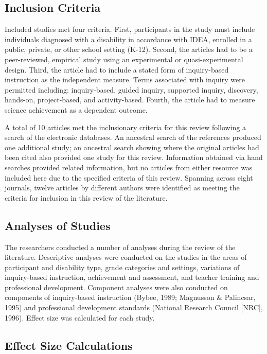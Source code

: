 \documentclass[11.5pt]{sig-alternate} %
\begin{document}
\begin{large}
\subsection*{Inclusion Criteria}

Included studies met four criteria.  First, participants in the study must include individuals diagnosed with a disability in accordance with IDEA, enrolled in a public, private, or other school setting (K-12).  Second, the articles had to be a peer-reviewed, empirical study using an experimental or quasi-experimental design.  Third, the article had to include a stated form of inquiry-based instruction as the independent measure.  Terms associated with inquiry were permitted including: inquiry-based, guided inquiry, supported inquiry, discovery, hands-on, project-based, and activity-based.  Fourth, the article had to measure science achievement as a dependent outcome. 

A total of 10 articles met the inclusionary criteria for this review following a search of the electronic databases.  An ancestral search of the references produced one additional study; an ancestral search showing where the original articles had been cited also provided one study for this review.  Information obtained via hand searches provided related information, but no articles from either resource was included here due to the specified criteria of this review.  Spanning across eight journals, twelve articles by different authors were identified as meeting the criteria for inclusion in this review of the literature.  

\subsection*{Analyses of Studies}

The researchers conducted a number of analyses during the review of the literature.  Descriptive analyses were conducted on the studies in the areas of participant and disability type, grade categories and settings, variations of inquiry-based instruction, achievement and assessment, and teacher training and professional development.  Component analyses were also conducted on components of inquiry-based instruction (Bybee, 1989; Magnusson \& Palincsar, 1995) and professional development standards (National Research Council [NRC], 1996).  Effect size was calculated for each study.

\subsection*{Effect Size Calculations}


\end{large}
\end{document}
